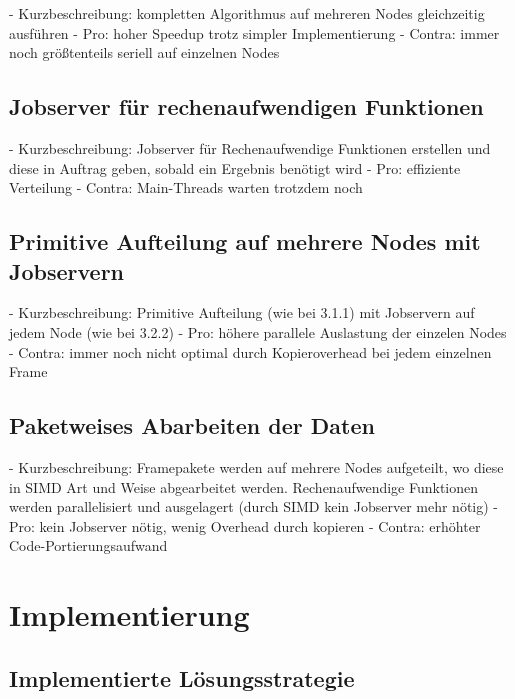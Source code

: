 - Kurzbeschreibung: kompletten Algorithmus auf mehreren Nodes gleichzeitig ausführen
- Pro: hoher Speedup trotz simpler Implementierung
- Contra: immer noch größtenteils seriell auf einzelnen Nodes

\subsection{Jobserver für rechenaufwendigen Funktionen}

- Kurzbeschreibung: Jobserver für Rechenaufwendige Funktionen erstellen und diese in Auftrag geben, sobald ein Ergebnis benötigt wird
- Pro: effiziente Verteilung
- Contra: Main-Threads warten trotzdem noch

\subsection{Primitive Aufteilung auf mehrere Nodes mit Jobservern}

- Kurzbeschreibung: Primitive Aufteilung (wie bei 3.1.1) mit Jobservern auf jedem Node (wie bei 3.2.2)
- Pro: höhere parallele Auslastung der einzelen Nodes
- Contra: immer noch nicht optimal durch Kopieroverhead bei jedem einzelnen Frame

\subsection{Paketweises Abarbeiten der Daten}

- Kurzbeschreibung: Framepakete werden auf mehrere Nodes aufgeteilt, wo diese in SIMD Art und Weise abgearbeitet werden. Rechenaufwendige Funktionen werden parallelisiert und ausgelagert (durch SIMD kein Jobserver mehr nötig)
- Pro: kein Jobserver nötig, wenig Overhead durch kopieren
- Contra: erhöhter Code-Portierungsaufwand

\section{Implementierung}

\subsection{Implementierte Lösungsstrategie}

